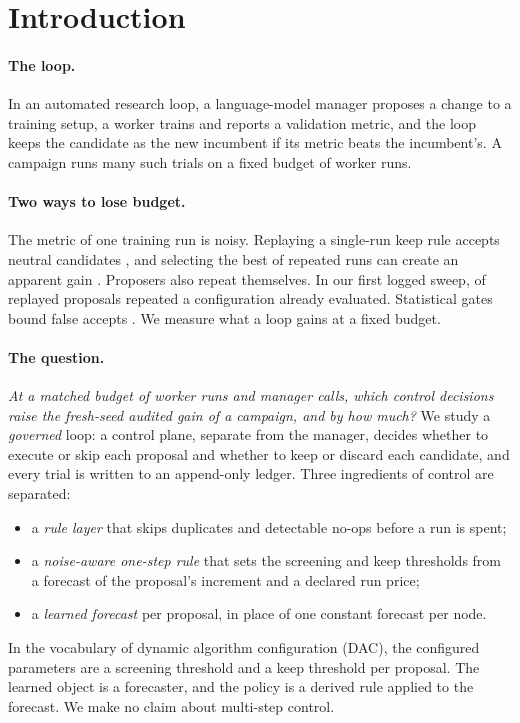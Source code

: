 \section{Introduction}

\paragraph{The loop.}
In an automated research loop, a language-model manager proposes a change to a training setup, a worker trains and reports a validation metric, and the loop keeps the candidate as the new incumbent if its metric beats the incumbent's. A campaign runs many such trials on a fixed budget of worker runs.

\paragraph{Two ways to lose budget.}
The metric of one training run is noisy. Replaying a single-run keep rule accepts neutral candidates \citep{jalaian2026noise}, and selecting the best of repeated runs can create an apparent gain \citep{grover2026lucky}. Proposers also repeat themselves. In our first logged sweep, \SweepOneDuplicates{} of \SweepOneProposals{} replayed proposals repeated a configuration already evaluated. Statistical gates bound false accepts \citep{wang2026sage,shawn2026pace,sgm2025,lonkar2026evidence}. We measure what a loop gains at a fixed budget.

\paragraph{The question.}
\emph{At a matched budget of worker runs and manager calls, which control decisions raise the fresh-seed audited gain of a campaign, and by how much?} We study a \emph{governed} loop: a control plane, separate from the manager, decides whether to execute or skip each proposal and whether to keep or discard each candidate, and every trial is written to an append-only ledger. Three ingredients of control are separated:
\begin{itemize}
\item a \emph{rule layer} that skips duplicates and detectable no-ops before a run is spent;
\item a \emph{noise-aware one-step rule} that sets the screening and keep thresholds from a forecast of the proposal's increment and a declared run price;
\item a \emph{learned forecast} per proposal, in place of one constant forecast per node.
\end{itemize}
In the vocabulary of dynamic algorithm configuration (DAC), the configured parameters are a screening threshold and a keep threshold per proposal. The learned object is a forecaster, and the policy is a derived rule applied to the forecast. We make no claim about multi-step control.

